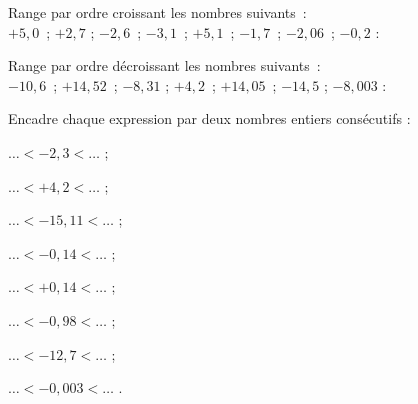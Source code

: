 \begin{exercice}
Range par ordre croissant les nombres suivants : \\[0.5em]
$+5,0$ ; $+2,7$ ; $-2,6$ ; $-3,1$ ; $+5,1$ ; $-1,7$ ; $-2,06$ ; $-0,2$ :

 \dotfill

 \dotfill
\end{exercice}


\begin{exercice}
Range par ordre décroissant les nombres suivants : \\[0.5em]
$-10,6$ ; $+14,52$ ; $-8,31$ ; $+4,2$ ; $+14,05$ ; $-14,5$ ; $-8,003$ :

 \dotfill

 \dotfill
\end{exercice}


\vspace{1cm}


\begin{exercice}
Encadre chaque expression par deux nombres entiers consécutifs :
\begin{colitemize}{2}
 \item $\ldots < -2,3 < \ldots$ ;
 \item $\ldots < +4,2 < \ldots$ ;
 \item $\ldots < -15,11 < \ldots$ ;
 \item $\ldots < -0,14 < \ldots$ ;
 \item $\ldots < +0,14 < \ldots$ ;
 \item $\ldots < -0,98 < \ldots$ ;
 \item $\ldots < -12,7 < \ldots$ ;
 \item $\ldots < -0,003 < \ldots$ .
 \end{colitemize}
\end{exercice}


